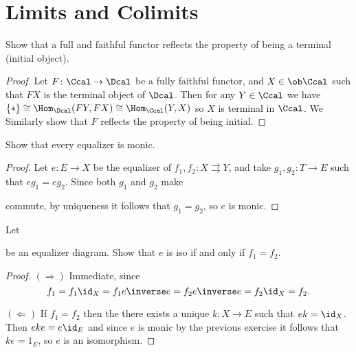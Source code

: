 \section{Limits and Colimits}

\begin{exercise}{21}
    Show that a full and faithful functor reflects the property of being a terminal (initial object).
\end{exercise}
\begin{solution}
    \begin{proof}
        Let $F\colon\Ccal\to\Dcal$ be a fully faithful functor, and $X\in\ob\Ccal$ such that $FX$ is the terminal object of $\Dcal$.
        Then for any $Y\in\Ccal$ we have $\{*\}\cong\Hom_{\Dcal}(FY, FX)\cong\Hom_{\Ccal}(Y, X)$ so $X$ is terminal in $\Ccal$. 
        We Similarly show that $F$ reflects the property of being initial.
    \end{proof}
\end{solution}


\begin{exercise}{22}
    Show that every equalizer is monic.
\end{exercise}
\begin{solution}
    \begin{proof}
        Let $e\colon E\to X$ be the equalizer of $f_1,f_2\colon X\rightrightarrows Y$, and take $g_1,g_2\colon T\to E$ such that $eg_1=eg_2$. 
        Since both $g_1$ and $g_2$ make
        commute, by uniqueness it follows that $g_1=g_2$, so $e$ is monic.
    \end{proof}
\end{solution}


\begin{exercise}{23}
    Let
    be an equalizer diagram. Show that $e$ is iso if and only if $f_1=f_2$.
\end{exercise}
\begin{solution}
    \begin{proof}
        $(\Rightarrow)$ Immediate, since
        \[ f_1=f_1\id_X= f_1e\inverse e=f_2 e\inverse e = f_2\id_X=f_2.  \]

        $(\Leftarrow)$ If $f_1=f_2$ then the there exists a unique $k\colon X\to E$ such that $ek=\id_X$.
        Then $eke=e\id_E$ and since $e$ is monic by the previous exercise it follows that $ke=1_E$, so $e$ is an isomorphism.

    \end{proof}
\end{solution}

